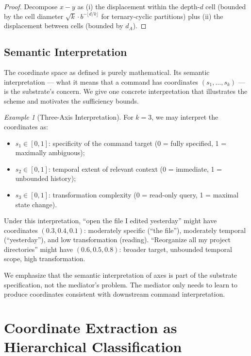\documentclass[11pt,twocolumn,a4paper]{article}
\theoremstyle{definition}
\theoremstyle{remark}
\newtheorem{example}[theorem]{Example}
\begin{document}
\begin{proof}
Decompose $x - y$ as (i) the displacement within the depth-$d$ cell (bounded by the cell diameter $\sqrt{k} \cdot b^{-\lfloor d/k \rfloor}$ for ternary-cyclic partitions) plus (ii) the displacement between cells (bounded by $d_A$).
\end{proof}

\subsection{Semantic Interpretation}

The coordinate space as defined is purely mathematical. Its semantic interpretation --- what it means that a command has coordinates $(s_1, \ldots, s_k)$ --- is the substrate's concern. We give one concrete interpretation that illustrates the scheme and motivates the sufficiency bounds.

\begin{example}[Three-Axis Interpretation]
\label{ex:three-axis}
For $k = 3$, we may interpret the coordinates as:
\begin{itemize}
    \item $s_1 \in [0,1]$: specificity of the command target (0 = fully specified, 1 = maximally ambiguous);
    \item $s_2 \in [0,1]$: temporal extent of relevant context (0 = immediate, 1 = unbounded history);
    \item $s_3 \in [0,1]$: transformation complexity (0 = read-only query, 1 = maximal state change).
\end{itemize}
Under this interpretation, ``open the file I edited yesterday'' might have coordinates $(0.3, 0.4, 0.1)$: moderately specific (``the file''), moderately temporal (``yesterday''), and low transformation (reading). ``Reorganize all my project directories'' might have $(0.6, 0.5, 0.8)$: broader target, unbounded temporal scope, high transformation.
\end{example}

We emphasize that the semantic interpretation of axes is part of the substrate specification, not the mediator's problem. The mediator only needs to learn to produce coordinates consistent with downstream command interpretation.

\section{Coordinate Extraction as Hierarchical Classification}
\label{sec:extraction}
\end{document}
